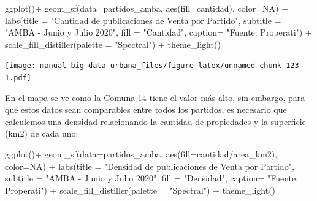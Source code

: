 \documentclass[
  spanish,
]{book}
\newenvironment{Shaded}{\begin{snugshade}}{\end{snugshade}}
\newcommand{\AttributeTok}[1]{\textcolor[rgb]{0.77,0.63,0.00}{#1}}
\newcommand{\ConstantTok}[1]{\textcolor[rgb]{0.00,0.00,0.00}{#1}}
\newcommand{\FunctionTok}[1]{\textcolor[rgb]{0.00,0.00,0.00}{#1}}
\newcommand{\NormalTok}[1]{#1}
\newcommand{\SpecialCharTok}[1]{\textcolor[rgb]{0.00,0.00,0.00}{#1}}
\newcommand{\StringTok}[1]{\textcolor[rgb]{0.31,0.60,0.02}{#1}}
\begin{document}
\begin{Shaded}
\begin{Highlighting}[]
\FunctionTok{ggplot}\NormalTok{()}\SpecialCharTok{+}
  \FunctionTok{geom\_sf}\NormalTok{(}\AttributeTok{data=}\NormalTok{partidos\_amba, }\FunctionTok{aes}\NormalTok{(}\AttributeTok{fill=}\NormalTok{cantidad), }\AttributeTok{color=}\ConstantTok{NA}\NormalTok{) }\SpecialCharTok{+}
    \FunctionTok{labs}\NormalTok{(}\AttributeTok{title =} \StringTok{"Cantidad de publicaciones de Venta por Partido"}\NormalTok{,}
         \AttributeTok{subtitle =} \StringTok{"AMBA {-} Junio y Julio 2020"}\NormalTok{,}
         \AttributeTok{fill =} \StringTok{"Cantidad"}\NormalTok{,}
         \AttributeTok{caption=} \StringTok{"Fuente: Properati"}\NormalTok{) }\SpecialCharTok{+}
  \FunctionTok{scale\_fill\_distiller}\NormalTok{(}\AttributeTok{palette =} \StringTok{"Spectral"}\NormalTok{) }\SpecialCharTok{+}
  \FunctionTok{theme\_light}\NormalTok{()}
\end{Highlighting}
\end{Shaded}

\texttt{[image: manual-big-data-urbana\_files/figure-latex/unnamed-chunk-123-1.pdf]}

En el mapa se ve como la Comuna 14 tiene el valor más alto, sin embargo, para que estos datos sean comparables entre todos los partidos, es necesario que calculemos una densidad relacionando la cantidad de propiedades y la superficie (km2) de cada uno:

\begin{Shaded}
\begin{Highlighting}[]
\FunctionTok{ggplot}\NormalTok{()}\SpecialCharTok{+}
  \FunctionTok{geom\_sf}\NormalTok{(}\AttributeTok{data=}\NormalTok{partidos\_amba, }\FunctionTok{aes}\NormalTok{(}\AttributeTok{fill=}\NormalTok{cantidad}\SpecialCharTok{/}\NormalTok{area\_km2), }\AttributeTok{color=}\ConstantTok{NA}\NormalTok{) }\SpecialCharTok{+}
    \FunctionTok{labs}\NormalTok{(}\AttributeTok{title =} \StringTok{"Densidad de publicaciones de Venta por Partido"}\NormalTok{,}
         \AttributeTok{subtitle =} \StringTok{"AMBA {-} Junio y Julio 2020"}\NormalTok{,}
         \AttributeTok{fill =} \StringTok{"Densidad"}\NormalTok{,}
         \AttributeTok{caption=} \StringTok{"Fuente: Properati"}\NormalTok{) }\SpecialCharTok{+}
  \FunctionTok{scale\_fill\_distiller}\NormalTok{(}\AttributeTok{palette =} \StringTok{"Spectral"}\NormalTok{) }\SpecialCharTok{+}
  \FunctionTok{theme\_light}\NormalTok{()}
\end{Highlighting}
\end{Shaded}
\end{document}
